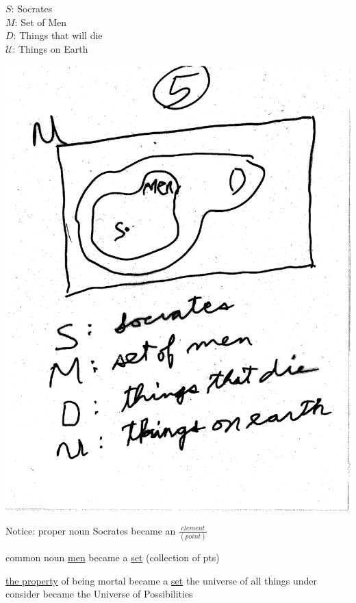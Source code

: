 \documentclass[10pt,a4paper]{article}
\begin{document}
$S$: Socrates\\
$M$: Set of Men\\
$D$: Things that will die\\
$\mathcal{U}$: Things on Earth

\includegraphics[scale=.5]{Pages/ST_5} 



\newpage
Notice:
proper noun Socrates 
became an $\frac {element} {(point)}$

common noun \underline{men}
became a \underline{set}
(collection of pts)

\underline{the property} of being mortal became a \underline{set} the universe of all things under consider became the Universe of Possibilities 
\end{document}
